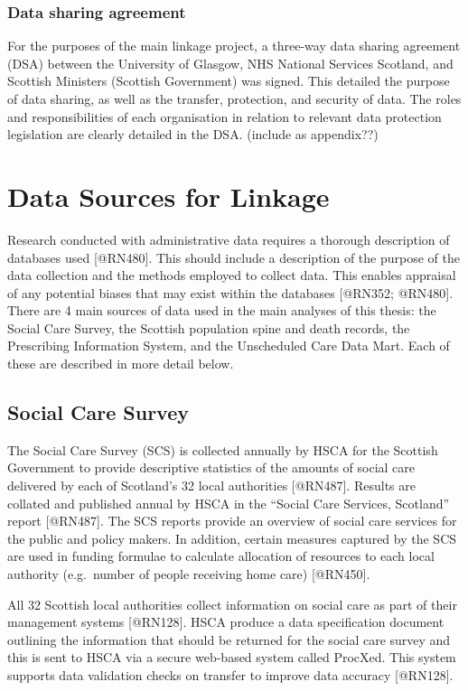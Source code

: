 \documentclass[]{article}
\begin{document}
\subsubsection{Data sharing agreement}\label{subsec:dsa}

For the purposes of the main linkage project, a three-way data sharing
agreement (DSA) between the University of Glasgow, NHS National Services
Scotland, and Scottish Ministers (Scottish Government) was signed. This
detailed the purpose of data sharing, as well as the transfer,
protection, and security of data. The roles and responsibilities of each
organisation in relation to relevant data protection legislation are
clearly detailed in the DSA. (include as appendix??)

\section{Data Sources for Linkage}\label{sec:sources}

Research conducted with administrative data requires a thorough
description of databases used {[}@RN480{]}. This should include a
description of the purpose of the data collection and the methods
employed to collect data. This enables appraisal of any potential biases
that may exist within the databases {[}@RN352; @RN480{]}. There are 4
main sources of data used in the main analyses of this thesis: the
Social Care Survey, the Scottish population spine and death records, the
Prescribing Information System, and the Unscheduled Care Data Mart. Each
of these are described in more detail below.

\subsection{Social Care Survey}\label{subsec:source-sc}

The Social Care Survey (SCS) is collected annually by HSCA for the
Scottish Government to provide descriptive statistics of the amounts of
social care delivered by each of Scotland's 32 local authorities
{[}@RN487{]}. Results are collated and published annual by HSCA in the
``Social Care Services, Scotland'' report {[}@RN487{]}. The SCS reports
provide an overview of social care services for the public and policy
makers. In addition, certain measures captured by the SCS are used in
funding formulae to calculate allocation of resources to each local
authority (e.g.~number of people receiving home care) {[}@RN450{]}.

All 32 Scottish local authorities collect information on social care as
part of their management systems {[}@RN128{]}. HSCA produce a data
specification document outlining the information that should be returned
for the social care survey and this is sent to HSCA via a secure
web-based system called ProcXed. This system supports data validation
checks on transfer to improve data accuracy {[}@RN128{]}.
\end{document}
